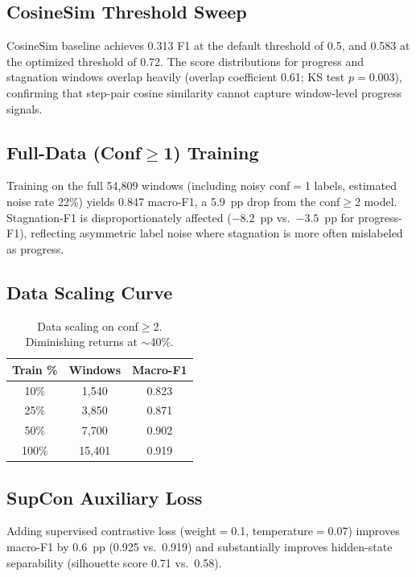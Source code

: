 \documentclass[11pt,a4paper]{article}
\begin{document}
\subsection{CosineSim Threshold Sweep}
\label{app:cosinesim}

CosineSim baseline achieves 0.313 F1 at the default threshold of 0.5, and 0.583 at the optimized threshold of 0.72. The score distributions for progress and stagnation windows overlap heavily (overlap coefficient 0.61; KS test $p{=}0.003$), confirming that step-pair cosine similarity cannot capture window-level progress signals.

\subsection{Full-Data (Conf$\geq$1) Training}
\label{app:fulldata}

Training on the full 54{,}809 windows (including noisy conf$=$1 labels, estimated noise rate 22\%) yields 0.847 macro-F1, a 5.9~pp drop from the conf$\geq$2 model. Stagnation-F1 is disproportionately affected ($-8.2$~pp vs.\ $-3.5$~pp for progress-F1), reflecting asymmetric label noise where stagnation is more often mislabeled as progress.

\subsection{Data Scaling Curve}
\label{app:scaling}

\begin{table}[h]
\centering
\small
\begin{tabular}{ccc}
\toprule
\textbf{Train \%} & \textbf{Windows} & \textbf{Macro-F1} \\
\midrule
10\% & 1{,}540 & 0.823 \\
25\% & 3{,}850 & 0.871 \\
50\% & 7{,}700 & 0.902 \\
100\% & 15{,}401 & 0.919 \\
\bottomrule
\end{tabular}
\caption{Data scaling on conf$\geq$2. Diminishing returns at ${\sim}$40\%.}
\label{tab:scaling}
\end{table}

\subsection{SupCon Auxiliary Loss}
\label{app:supcon}

Adding supervised contrastive loss (weight$=$0.1, temperature$=$0.07) improves macro-F1 by 0.6~pp (0.925 vs.\ 0.919) and substantially improves hidden-state separability (silhouette score 0.71 vs.\ 0.58).
\end{document}
